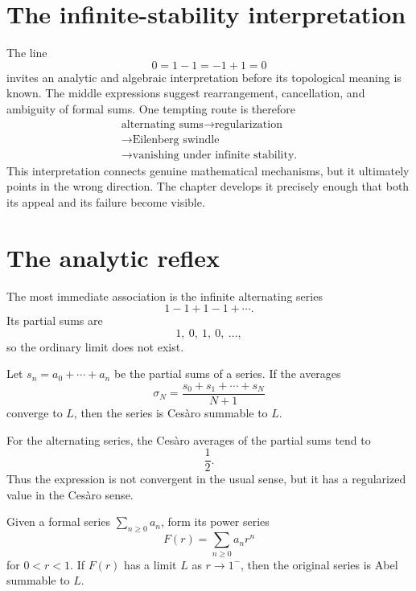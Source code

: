 
\section{The infinite-stability interpretation}

The line
\[
  0=1-1=-1+1=0
\]
invites an analytic and algebraic interpretation before its topological meaning is known.  The middle expressions suggest rearrangement, cancellation, and ambiguity of formal sums.  One tempting route is therefore
\[
\begin{array}{c}
  \text{alternating sums}\longrightarrow\text{regularization}\\
  \longrightarrow\text{Eilenberg swindle}\\
  \longrightarrow\text{vanishing under infinite stability.}
\end{array}
\]
This interpretation connects genuine mathematical mechanisms, but it ultimately points in the wrong direction.  The chapter develops it precisely enough that both its appeal and its failure become visible.

\section{The analytic reflex}

The most immediate association is the infinite alternating series
\[
  1-1+1-1+\cdots.
\]
Its partial sums are
\[
  1,\ 0,\ 1,\ 0,\ \ldots,
\]
so the ordinary limit does not exist.

\begin{definition}
Let \(s_n=a_0+\cdots+a_n\) be the partial sums of a series.  If the averages
\[
  \sigma_N=\frac{s_0+s_1+\cdots+s_N}{N+1}
\]
converge to \(L\), then the series is Ces\`aro summable to \(L\).
\end{definition}

For the alternating series, the Ces\`aro averages of the partial sums tend to
\[
  \frac12.
\]
Thus the expression is not convergent in the usual sense, but it has a regularized value in the Ces\`aro sense.

\begin{definition}
Given a formal series \(\sum_{n\ge0}a_n\), form its power series
\[
  F(r)=\sum_{n\ge0}a_nr^n
\]
for \(0<r<1\).  If \(F(r)\) has a limit \(L\) as \(r\to1^-\), then the original series is Abel summable to \(L\).
\end{definition}

